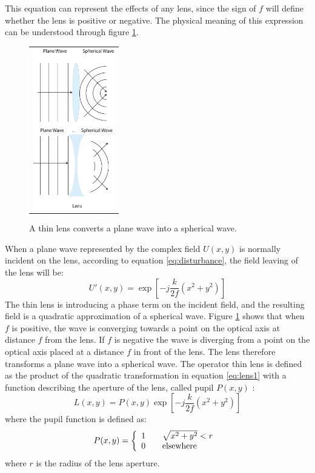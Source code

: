  This equation can represent the effects of any lens, since the sign of $f$ will define whether the lens is positive or negative.
 The physical meaning of this expression can be understood through figure \ref{fig:lensmeaning}.
	\begin{figure}[h]
		\begin{center}
			\begin{tabular}{c}
					\includegraphics[height=7cm]{lens3.eps}
			\end{tabular}
		\end{center}
		\caption{ \label{fig:lensmeaning} 
			A thin lens converts a plane wave into a spherical wave. }
	\end{figure} 
	When a plane wave represented by the complex field $U(x,y)$ is normally incident on the lens, according to equation \ref{eq:disturbance}, the field leaving of the lens will be:
	\begin{equation}
	\label{eq:disturbance2}
		U'(x,y)=\exp[-j\frac{k}{2f}(x^2+y^2)]
	\end{equation}
	The thin lens is introducing a phase term on the incident field, and the resulting field is a quadratic approximation of a spherical wave. Figure \ref{fig:lensmeaning} shows that when $f$ is positive, the wave is converging towards a point on the optical axis at distance $f$ from the lens. If $f$ is negative the wave is diverging from a point on the optical axis placed at a distance $f$ in front of the lens. The lens therefore transforms a plane wave into a spherical wave. 
	The operator thin lens is defined as the product of the quadratic transformation in equation \ref{eq:lens1} with a function describing the aperture of the lens, called pupil $P(x,y)$ :
	\begin{equation}
	\label{eq:lesop}
		L(x,y)=P(x,y)\exp[-j\frac{k}{2f}(x^2+y^2)]
	\end{equation}
	where the pupil function is defined as:
	\begin{equation}
	\label{eq:pupil}
	 P(x,y) = \left\{
		\begin{array}{l l}
		1 & \quad \sqrt{x^2+y^2}<r \\
		0 & \quad \text{elsewhere}
		\end{array} \right.\
	\end{equation}
	where $r$ is the radius of the lens aperture.
